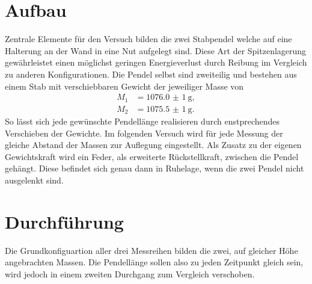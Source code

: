 \newpage
\section{Aufbau}
Zentrale Elemente für den Versuch bilden die zwei Stabpendel welche auf eine Halterung an der Wand in eine Nut aufgelegt sind.
Diese Art der Spitzenlagerung gewährleistet einen möglichst geringen Energieverlust durch Reibung im Vergleich zu anderen Konfigurationen. 
Die Pendel selbst sind zweiteilig und bestehen aus einem Stab mit verschiebbaren Gewicht der jeweiliger Masse von 
\begin{align*}
    M_1 &= \SI{1076,0(1)}{\g}, \\
    M_2 &= \SI{1075,5(1)}{\g}.
\end{align*}
So lässt sich jede gewünschte Pendellänge realisieren durch enstprechendes Verschieben der Gewichte. Im folgenden Versuch wird 
für jede Messung der gleiche Abstand der Massen zur Auflegung eingestellt.
Als Zusatz zu der eigenen Gewichtskraft wird ein Feder, als erweiterte Rückstellkraft, zwischen die Pendel gehängt. 
Diese befindet sich genau dann in Ruhelage, wenn die zwei Pendel nicht ausgelenkt sind. 

\section{Durchführung}
Die Grundkonfiguartion aller drei Messreihen bilden die zwei, auf gleicher Höhe angebrachten Massen. Die Pendellänge sollen also zu jeden Zeitpunkt
gleich sein, wird jedoch in einem zweiten Durchgang zum Vergleich verschoben.



